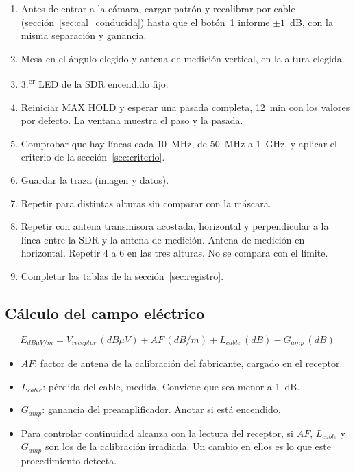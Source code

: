 \documentclass[11pt,a4paper]{article}
\begin{document}
\begin{enumerate}
  \item Antes de entrar a la cámara, cargar patrón y recalibrar por cable (sección~\ref{sec:cal_conducida}) hasta que el botón~1 informe $\pm 1$~dB, con la misma separación y ganancia.
  \item Mesa en el ángulo elegido y antena de medición vertical, en la altura elegida.
  \item 3.\textsuperscript{er} LED de la SDR encendido fijo.
  \item Reiniciar MAX HOLD y esperar una pasada completa, 12~min con los valores por defecto. La ventana muestra el paso y la pasada.
  \item Comprobar que hay líneas cada 10~MHz, de 50~MHz a 1~GHz, y aplicar el criterio de la sección~\ref{sec:criterio}.
  \item Guardar la traza (imagen y datos).
  \item Repetir para distintas alturas sin comparar con la máscara.
  \item Repetir con antena transmisora acostada, horizontal y perpendicular a la línea entre la SDR y la antena de medición. Antena de medición en horizontal. Repetir 4 a 6 en las tres alturas. No se compara con el límite.
  \item Completar las tablas de la sección~\ref{sec:registro}.
\end{enumerate}




\subsection{Cálculo del campo eléctrico}

\begin{equation}
  E_{dB\mu V/m} = V_{receptor}\,(dB\mu V) + AF\,(dB/m)
    + L_{cable}\,(dB) - G_{amp}\,(dB)
\end{equation}

\begin{itemize}
  \item $AF$: factor de antena de la calibración del fabricante, cargado en el receptor.
  \item $L_{cable}$: pérdida del cable, medida. Conviene que sea menor a 1~dB.
  \item $G_{amp}$: ganancia del preamplificador. Anotar si está encendido.
  \item Para controlar continuidad alcanza con la lectura del receptor, si $AF$, $L_{cable}$ y $G_{amp}$ son los de la calibración irradiada. Un cambio en ellos es lo que este procedimiento detecta.
\end{itemize}
\end{document}
